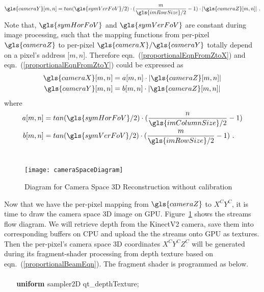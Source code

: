 %
\begin{equation}
\gls{cameraY} [m, n] = tan(\gls{symVerFoV} / 2) \cdot (\frac{m}{\gls{imRowSize}/2} - 1) \cdot |\gls{cameraZ} [m, n]| \  .
\label{proportionalEqnFromZtoY}
\end{equation}%
\noindent
Note that, \(\gls{symHorFoV}\) and \(\gls{symVerFoV}\) are constant during image processing, such that the mapping functions from per-pixel \(\gls{cameraZ}\) to per-pixel \(\gls{cameraX}/\gls{cameraY}\) totally depend on a pixel's address [\(m, n\)]. Therefore eqn.~(\ref{proportionalEqnFromZtoX}) and eqn.~(\ref{proportionalEqnFromZtoY}) could be expressed as 
%
\begin{equation}
\begin{aligned}
\gls{cameraX} [m, n] &= a [m, n] \cdot |\gls{cameraZ} [m, n]|
\\%
\gls{cameraY} [m, n] &= b [m, n] \cdot |\gls{cameraZ} [m, n]| 
\end{aligned}
\label{proportionalBeamEqn}
\end{equation}%
\noindent
where
%
\begin{equation}
\begin{aligned}
a[m, n] &= tan(\gls{symHorFoV} / 2) \cdot (\frac{n}{\gls{imColumnSize} / 2} - 1)
\\%
b[m, n] &= tan(\gls{symVerFoV} / 2) \cdot (\frac{m}{\gls{imRowSize} / 2} - 1) \, \, .
\end{aligned}
\label{parametersABofProportional}
\end{equation}%
\\\indent
%
\begin{figure}[!t]
\centering
\texttt{[image: cameraSpaceDiagram]}
\caption{Diagram for Camera Space \gls{3D} Reconstruction without calibration}
\label{cameraSpaceDiagram}
\end{figure}%
%
Now that we have the per-pixel mapping from \(\gls{cameraZ}\) to \(X^CY^C\), it is time to draw the camera space \gls{3D} image on \gls{GPU}. Figure~\ref{cameraSpaceDiagram} shows the streams flow diagram. We will retrieve depth from the \gls{KinectV2} camera, save them into corresponding buffers on CPU and upload the the streams onto \gls{GPU} as textures. Then the per-pixel's camera space \gls{3D} coordinates \(X^CY^CZ^C\) will be generated during its fragment-shader processing from depth texture based on eqn.~(\ref{proportionalBeamEqn}). The fragment shader is programmed as below.
\\\\%
{\ttfamily
\textbf{\textcolor[rgb]{0.5019608,0.5019608,0.0}{\ \ \ uniform }}\textcolor[rgb]{0.7529412,0.7529412,0.7529412}{
 }\textcolor[rgb]{0.5019608,0.5019608,0.0}{sampler2D }\textcolor[rgb]{0.7529412,0.7529412,0.7529412}{
}qt\_depthTexture;\textcolor[rgb]{0.7529412,0.7529412,0.7529412}{
\ \ }}

